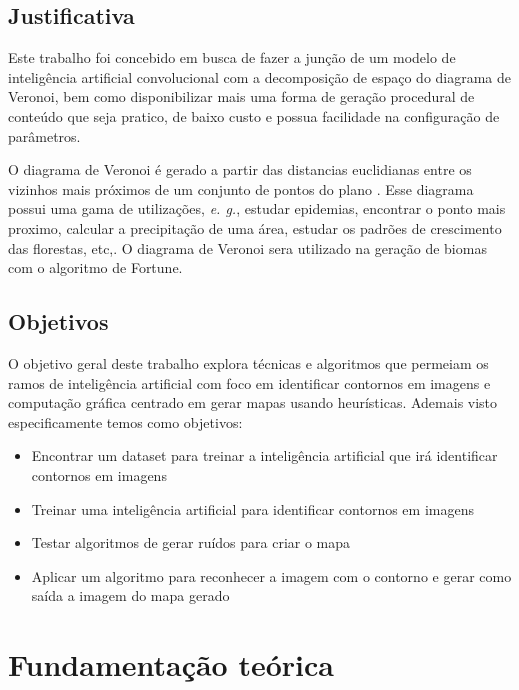 \documentclass[
	12pt,				%
	openright,			%
	twoside,			%
	a4paper,			%
	english,			%
	french,				%
	spanish,			%
	brazil				%
	]{abntex2}
\begin{document}
\section*{Justificativa}

Este trabalho foi concebido em busca de fazer a junção de um modelo de inteligência artificial convolucional com a decomposição de espaço do diagrama de Veronoi, bem como 
disponibilizar mais uma forma de geração procedural de conteúdo que seja pratico, de baixo custo e possua
facilidade na configuração de parâmetros.

O diagrama de Veronoi é gerado a partir das distancias euclidianas entre os vizinhos mais próximos de um conjunto de pontos do plano\space
\cite{diagrama_de_voronoi:_uma_exploracao_nas_distancias_euclidiana_e_do_taxi}. Esse diagrama possui uma gama de utilizações, \emph{e. g.}, estudar epidemias, encontrar o 
ponto mais proximo, calcular a precipitação de uma área, estudar os padrões de crescimento das florestas, etc,\space\cite{poligonos_de_thiessen_ou_voronoi}. O diagrama de 
Veronoi sera utilizado na geração de biomas com o algoritmo de Fortune.

\section*{Objetivos}

O objetivo geral deste trabalho explora técnicas e algoritmos que permeiam os ramos de inteligência artificial com foco em identificar contornos em imagens e computação 
gráfica centrado em gerar mapas usando heurísticas.
Ademais visto especificamente temos como objetivos:

\begin{itemize}
	\item Encontrar um dataset para treinar a inteligência artificial que irá identificar contornos em imagens
	\item Treinar uma inteligência artificial para identificar contornos em imagens
	\item Testar algoritmos de gerar ruídos para criar o mapa
	\item Aplicar um algoritmo para reconhecer a imagem com o contorno e gerar como saída a imagem do mapa gerado
\end{itemize}


\chapter{Fundamentação teórica}
\label{sec:background}
	\label{sec:fund_teorica}
\end{document}

